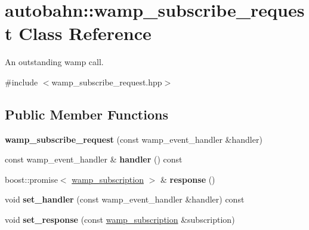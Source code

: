 \hypertarget{classautobahn_1_1wamp__subscribe__request}{}\section{autobahn\+:\+:wamp\+\_\+subscribe\+\_\+request Class Reference}
\label{classautobahn_1_1wamp__subscribe__request}


An outstanding wamp call.  




{\ttfamily \#include $<$wamp\+\_\+subscribe\+\_\+request.\+hpp$>$}

\subsection*{Public Member Functions}
\begin{DoxyCompactItemize}
\item 
{\bfseries wamp\+\_\+subscribe\+\_\+request} (const wamp\+\_\+event\+\_\+handler \&handler)\hypertarget{classautobahn_1_1wamp__subscribe__request_a240cc9e38147c44e6e7b7cb003a60fd8}{}\label{classautobahn_1_1wamp__subscribe__request_a240cc9e38147c44e6e7b7cb003a60fd8}

\item 
const wamp\+\_\+event\+\_\+handler \& {\bfseries handler} () const \hypertarget{classautobahn_1_1wamp__subscribe__request_a6b2f2ecb127a6b9ab4c997106887c695}{}\label{classautobahn_1_1wamp__subscribe__request_a6b2f2ecb127a6b9ab4c997106887c695}

\item 
boost\+::promise$<$ \hyperlink{classautobahn_1_1wamp__subscription}{wamp\+\_\+subscription} $>$ \& {\bfseries response} ()\hypertarget{classautobahn_1_1wamp__subscribe__request_afcf89c5ab1130cf19440dd3e699641bf}{}\label{classautobahn_1_1wamp__subscribe__request_afcf89c5ab1130cf19440dd3e699641bf}

\item 
void {\bfseries set\+\_\+handler} (const wamp\+\_\+event\+\_\+handler \&handler) const \hypertarget{classautobahn_1_1wamp__subscribe__request_ae4c59e370b322d879526623654e79c86}{}\label{classautobahn_1_1wamp__subscribe__request_ae4c59e370b322d879526623654e79c86}

\item 
void {\bfseries set\+\_\+response} (const \hyperlink{classautobahn_1_1wamp__subscription}{wamp\+\_\+subscription} \&subscription)\hypertarget{classautobahn_1_1wamp__subscribe__request_a82f5364cdefde46d0003a6a3ab4c5e37}{}\label{classautobahn_1_1wamp__subscribe__request_a82f5364cdefde46d0003a6a3ab4c5e37}

\end{DoxyCompactItemize}


